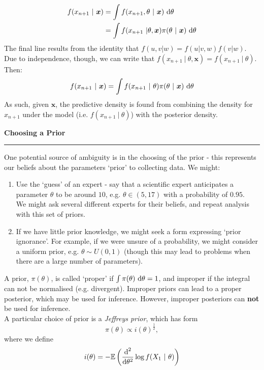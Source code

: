 \documentclass[12pt]{article}
\newcommand{\minisection}[1]{
    \par\vspace{0.25cm}
    \textbf{#1}\par
    \vspace{0.1cm}
    \hrule
    \vspace{0.25cm}
}
\begin{document}
    \begin{align*}
        f(x_{n+1}\ |\ \bm x) &= \int f(x_{n+1},\theta\ |\ \bm x)\ \text d\theta\\
        &= \int f(x_{n+1}\ | \theta,\bm x)\pi(\theta\ |\ \bm x)\ \text d\theta
    \end{align*}
    The final line results from the identity that $f(u,v|w) = f(u|v,w)f(v|w)$.\\
    Due to independence, though, we can write that $f(x_{n+1}\ |\ \theta,\bm x) = f(x_{n+1}\ |\ \theta)$. Then:
    \begin{equation*}
        f(x_{n+1}\ |\ \bm x) = \int f(x_{n+1}\ |\ \theta)\pi(\theta\ |\ \bm x)\ \text d\theta
    \end{equation*}
    As such, given $\bm x$, the predictive density is found from combining the density for $x_{n+1}$ under the model (i.e. $f(x_{n+1}\ |\ \theta)$) with the posterior density.
    \minisection{Choosing a Prior}
    One potential source of ambiguity is in the choosing of the prior - this represents our beliefs about the parameters `prior' to collecting data. We might:
    \begin{enumerate}
        \item Use the `guess' of an expert - say that a scientific expert anticipates a parameter $\theta$ to be around $10$, e.g. $\theta\in(5,17)$ with a probability of $0.95$.\\
        We might ask several different experts for their beliefs, and repeat analysis with this set of priors.
        \item If we have little prior knowledge, we might seek a form expressing `prior ignorance'. For example, if we were unsure of a probability, we might consider a uniform prior, e.g. $\theta\sim U(0,1)$ (though this may lead to problems when there are a large number of parameters).
    \end{enumerate}
    A prior, $\pi(\theta)$, is called `proper' if $\int \pi(\theta)\ \text d\theta = 1$, and improper if the integral can not be normalised (e.g. divergent). Improper priors can lead to a proper posterior, which may be used for inference. However, improper posteriors can \textbf{not} be used for inference.\\
    A particular choice of prior is a \textit{Jeffreys prior}, which has form
    \begin{equation*}
        \pi(\theta) \propto i(\theta)^{\frac 12},
    \end{equation*}
    where we define
    \begin{equation*}
        i(\theta) = -\mathbb E\left(\frac{\text d^2}{\text d\theta^2}\log f(X_1\ |\ \theta)\right)
    \end{equation*}
\end{document}
